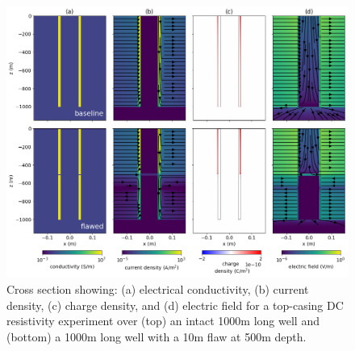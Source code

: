 \begin{figure}
    \begin{center}
    \includegraphics[width=\textwidth]{figures/casing_integrity_basics.png}
    \end{center}
\caption{
    Cross section showing: (a) electrical conductivity, (b) current density, (c) charge density, and (d) electric field
    for a top-casing DC resistivity experiment over (top) an intact 1000m long well and (bottom) a 1000m long well
    with a 10m flaw at 500m depth.
}
\label{fig:casing_integrity_basics}
\end{figure}
